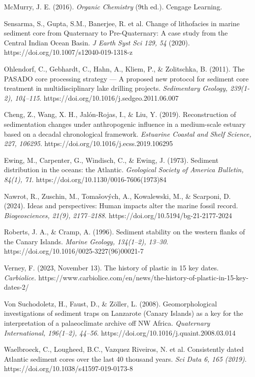 \documentclass[twocolumn,a4paper,aps,amsmath,amssymb,floatfix,superscriptaddress]{revtex4-2}
\begin{document}
\begin{thebibliography}{99}
		McMurry, J. E. (2016). \textit{Organic Chemistry} (9th ed.). Cengage Learning.
		
		Sensarma, S., Gupta, S.M., Banerjee, R. et al. Change of lithofacies in marine sediment core from Quaternary to Pre-Quaternary: A case study from the Central Indian Ocean Basin. \textit{J Earth Syst Sci 129, 54} (2020). https://doi.org/10.1007/s12040-019-1318-z 
		
		Ohlendorf, C., Gebhardt, C., Hahn, A., Kliem, P., \& Zolitschka, B. (2011). The PASADO core processing strategy — A proposed new protocol for sediment core treatment in multidisciplinary lake drilling projects. \textit{Sedimentary Geology, 239(1-2), 104–115}. https://doi.org/10.1016/j.sedgeo.2011.06.007
		
		Cheng, Z., Wang, X. H., Jalón-Rojas, I., \& Liu, Y. (2019). Reconstruction of sedimentation changes under anthropogenic influence in a medium-scale estuary based on a decadal chronological framework. \textit{Estuarine Coastal and Shelf Science, 227, 106295}. https://doi.org/10.1016/j.ecss.2019.106295
		
		 Ewing, M., Carpenter, G., Windisch, C., \& Ewing, J. (1973). Sediment distribution in the oceans: the Atlantic. \textit{Geological Society of America Bulletin, 84(1), 71}. https://doi.org/10.1130/0016-7606(1973)84
		
		Nawrot, R., Zuschin, M., Tomašových, A., Kowalewski, M., \& Scarponi, D. (2024). Ideas and perspectives: Human impacts alter the marine fossil record. \textit{Biogeosciences, 21(9), 2177–2188}. https://doi.org/10.5194/bg-21-2177-2024
		
		 Roberts, J. A., \& Cramp, A. (1996). Sediment stability on the western flanks of the Canary Islands. \textit{Marine Geology, 134(1–2), 13–30}. https://doi.org/10.1016/0025-3227(96)00021-7
		
		 Verney, F. (2023, November 13). The history of plastic in 15 key dates. \textit{Carbiolice.} https://www.carbiolice.com/en/news/the-history-of-plastic-in-15-key-dates-2/
		
		 Von Suchodoletz, H., Faust, D., \& Zöller, L. (2008). Geomorphological investigations of sediment traps on Lanzarote (Canary Islands) as a key for the interpretation of a palaeoclimate archive off NW Africa. \textit{Quaternary International, 196(1–2), 44–56}. https://doi.org/10.1016/j.quaint.2008.03.014
		
		Waelbroeck, C., Lougheed, B.C., Vazquez Riveiros, N. et al. Consistently dated Atlantic sediment cores over the last 40 thousand years. \textit{Sci Data 6, 165 (2019)}. https://doi.org/10.1038/s41597-019-0173-8
	\end{thebibliography}
	
\end{document}
